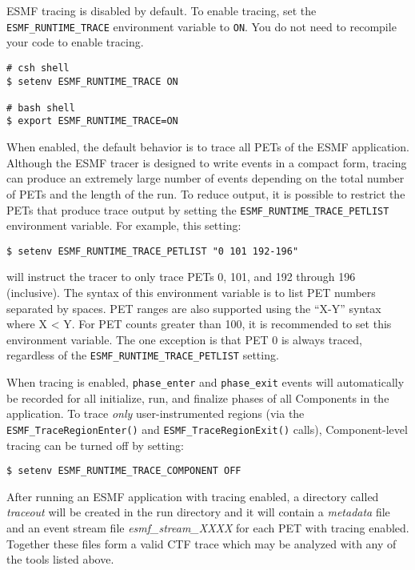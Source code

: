 %


ESMF tracing is disabled by default. To enable tracing, set the
{\tt ESMF\_RUNTIME\_TRACE} environment variable to {\tt ON}. You
do not need to recompile your code to enable tracing.

\begin{verbatim}
# csh shell
$ setenv ESMF_RUNTIME_TRACE ON

# bash shell
$ export ESMF_RUNTIME_TRACE=ON
\end{verbatim}

When enabled, the default behavior is to trace all PETs of the
ESMF application. Although the ESMF tracer is designed to write 
events in a compact form, tracing can produce an extremely
large number of events depending on the total number of PETs and
the length of the run. To reduce output, it is possible to restrict
the PETs that produce trace output by setting the {\tt ESMF\_RUNTIME\_TRACE\_PETLIST}
environment variable. For example, this setting:

\begin{verbatim}
$ setenv ESMF_RUNTIME_TRACE_PETLIST "0 101 192-196"
\end{verbatim}

will instruct the tracer to only trace PETs 0, 101, and 192 through 196
(inclusive). The syntax of this environment variable is to list
PET numbers separated by spaces. PET ranges are also supported using
the ``X-Y'' syntax where X < Y. For PET counts greater than 100, it is
recommended to set this environment variable. The one exception is that
PET 0 is always traced, regardless of the {\tt ESMF\_RUNTIME\_TRACE\_PETLIST}
setting.

When tracing is enabled, {\tt phase\_enter} and {\tt phase\_exit} events will
automatically be recorded for all initialize, run, and finalize phases of all
Components in the application. To trace {\em only} user-instrumented regions (via
the {\tt ESMF\_TraceRegionEnter()} and {\tt ESMF\_TraceRegionExit()} calls),
Component-level tracing can be turned off by setting:

\begin{verbatim}
$ setenv ESMF_RUNTIME_TRACE_COMPONENT OFF
\end{verbatim}

After running an ESMF application with tracing enabled, a directory
called {\em traceout} will be created in the run directory and it will
contain a {\em metadata} file and an event stream file {\em esmf\_stream\_XXXX}
for each PET with tracing enabled. Together these files form a valid
CTF trace which may be analyzed with any of the tools listed above.
